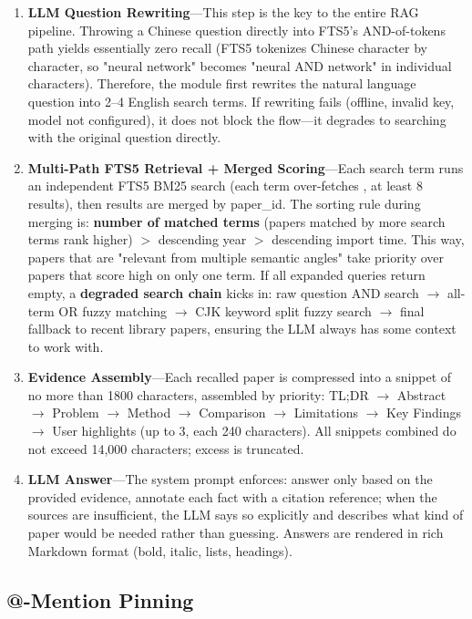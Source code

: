 \begin{enumerate}
  \item \textbf{LLM Question Rewriting}---This step is the key to the entire RAG pipeline. Throwing
    a Chinese question directly into FTS5's AND-of-tokens path yields essentially zero recall
    (FTS5  tokenizes Chinese character by character, so "neural network" becomes
    "neural AND network" in individual characters). Therefore, the  module first
    rewrites the natural language question into 2--4 English search terms. If rewriting fails
    (offline, invalid key, model not configured), it does not block the flow---it degrades to
    searching with the original question directly.
  \item \textbf{Multi-Path FTS5 Retrieval + Merged Scoring}---Each search term runs an independent
    FTS5 BM25 search (each term over-fetches , at least 8 results), then
    results are merged by paper\_id. The sorting rule during merging is: \textbf{number of matched
    terms} (papers matched by more search terms rank higher) $>$ descending year $>$ descending
    import time. This way, papers that are "relevant from multiple semantic angles" take priority
    over papers that score high on only one term. If all expanded queries return empty, a
    \textbf{degraded search chain} kicks in: raw question AND search $\rightarrow$ all-term OR
    fuzzy matching $\rightarrow$ CJK keyword split fuzzy search $\rightarrow$ final fallback to
    recent library papers, ensuring the LLM always has some context to work with.
  \item \textbf{Evidence Assembly}---Each recalled paper is compressed into a snippet of no more
    than 1800 characters, assembled by priority: TL;DR $\to$ Abstract $\to$ Problem $\to$ Method
    $\to$ Comparison $\to$ Limitations $\to$ Key Findings $\to$ User highlights (up to 3, each 240
    characters). All snippets combined do not exceed 14,000 characters; excess is truncated.
  \item \textbf{LLM Answer}---The system prompt enforces: answer only based on the provided
    evidence, annotate each fact with a \cmd{[N]} citation reference; when the sources are
    insufficient, the LLM says so explicitly and describes what kind of paper would be needed
    rather than guessing. Answers are rendered in rich Markdown format (bold, italic, lists,
    headings).
\end{enumerate}

\subsection{@-Mention Pinning}

